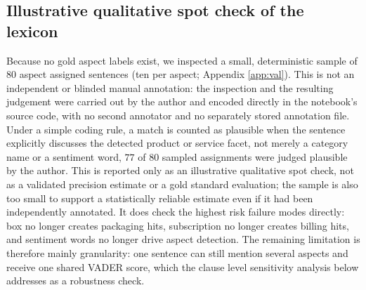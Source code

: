 \documentclass[11pt,a4paper,DIV=12]{scrartcl}
\begin{document}
\subsection{Illustrative qualitative spot check of the lexicon}
Because no gold aspect labels exist, we inspected a small, deterministic sample
of $80$ aspect assigned sentences (ten per aspect; Appendix \ref{app:val}).
This is not an independent or blinded manual annotation: the
inspection and the resulting judgement were carried out by the author and
encoded directly in the notebook's source code, with no second annotator and
no separately stored annotation file. Under a simple coding rule, a match is
counted as plausible when the sentence explicitly discusses the detected
product or service facet, not merely a category name or a sentiment word,
$77$ of $80$ sampled assignments were judged plausible by the author. This is
reported only as an illustrative qualitative spot check, not as a
validated precision estimate or a gold standard evaluation; the sample is also
too small to support a statistically reliable estimate even if it had been
independently annotated. It does check the highest risk failure modes directly:
box no longer creates packaging hits, subscription no longer
creates billing hits, and sentiment words no longer drive aspect detection. The
remaining limitation is therefore mainly granularity: one sentence can still
mention several aspects and receive one shared VADER score, which the
clause level sensitivity analysis below addresses as a robustness check.
\end{document}
